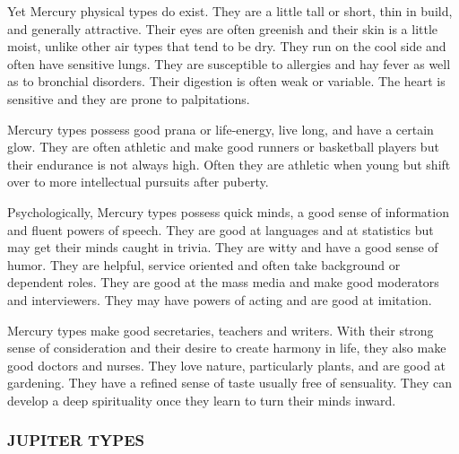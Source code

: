  

Yet Mercury physical types do exist. They are a little tall or short, thin in build, and generally attractive. Their eyes are often greenish and their skin is a little moist, unlike other air types that tend to be dry. They run on the cool side and often have sensitive lungs. They are susceptible to allergies and hay fever as well as to bronchial disorders. Their digestion is often weak or variable. The heart is sensitive and they are prone to palpitations.

 

Mercury types possess good prana or life‑energy, live long, and have a certain glow. They are often athletic and make good runners or basketball players but their endurance is not always high. Often they are athletic when young but shift over to more intellectual pursuits after puberty.

 

Psychologically, Mercury types possess quick minds, a good sense of information and fluent powers of speech. They are good at languages and at statistics but may get their minds caught in trivia. They are witty and have a good sense of humor. They are helpful, service oriented and often take background or dependent roles. They are good at the mass media and make good moderators and interviewers. They may have powers of acting and are good at imitation.

 

Mercury types make good secretaries, teachers and writers. With their strong sense of consideration and their desire to create harmony in life, they also make good doctors and nurses. They love nature, particularly plants, and are good at gardening. They have a refined sense of taste usually free of sensuality. They can develop a deep spirituality once they learn to turn their minds inward.

 



\subsubsection{JUPITER TYPES}

